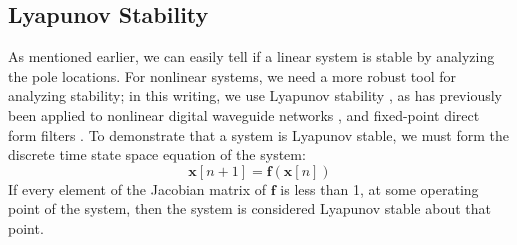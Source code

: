 \documentclass{IEEEtran}
\begin{document}
\subsection{Lyapunov Stability}
%
As mentioned earlier, we can easily tell if a linear system is stable
by analyzing the pole locations. For nonlinear systems, we need a
more robust tool for analyzing stability; in this writing, we use
Lyapunov stability \cite{Lyapunov}, as has previously been applied
to nonlinear digital waveguide networks \cite{JOS-Waveguide}, and
fixed-point direct form filters \cite{LyapunovFixedPointFilters}. To
demonstrate that a system is Lyapunov stable, we must form the discrete
time state space equation of the system:
%
\begin{equation}
    \mathbf{x}[n+1] = \mathbf{f}(\mathbf{x}[n])
    \label{eq:lyapunov_general}
\end{equation}
%
If every element of the Jacobian matrix of $\mathbf{f}$ is less than 1,
at some operating point of the system, then the system is considered
Lyapunov stable about that point.
\end{document}

